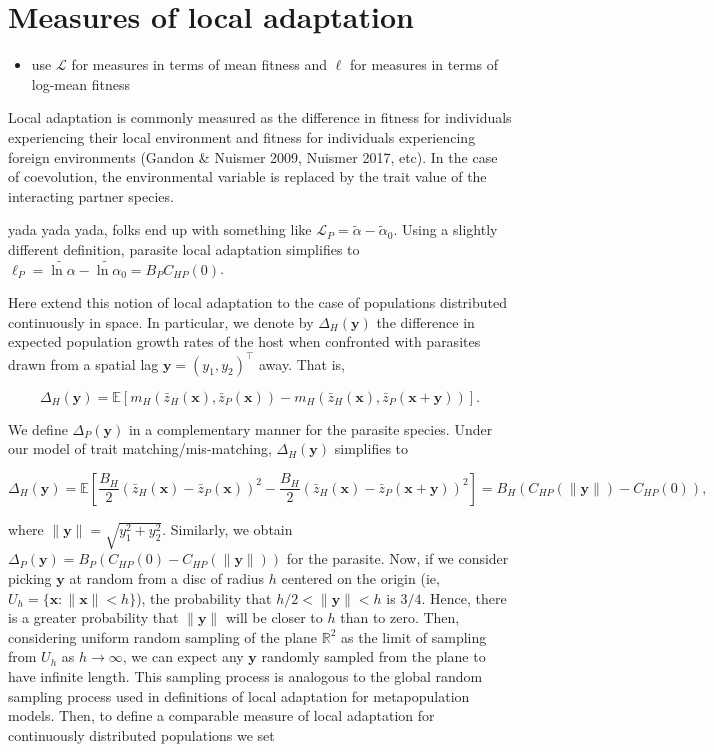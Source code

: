 \documentclass{article}
\begin{document}
\hypertarget{measures-of-local-adaptation}{%
\section{\texorpdfstring{Measures of local adaptation
\label{la-app}}{Measures of local adaptation }}\label{measures-of-local-adaptation}}

\begin{itemize}
\tightlist
\item
  use \(\mathcal L\) for measures in terms of mean fitness and \(\ell\)
  for measures in terms of log-mean fitness
\end{itemize}

Local adaptation is commonly measured as the difference in fitness for
individuals experiencing their local environment and fitness for
individuals experiencing foreign environments (Gandon \& Nuismer 2009,
Nuismer 2017, etc). In the case of coevolution, the environmental
variable is replaced by the trait value of the interacting partner
species.

yada yada yada, folks end up with something like
\(\mathcal L_P=\tilde\alpha-\tilde\alpha_0\). Using a slightly different
definition, parasite local adaptation simplifies to
\(\ell_P=\widetilde{\ln\alpha}-\widetilde{\ln\alpha}_0=B_PC_{HP}(0)\).

Here extend this notion of local adaptation to the case of populations
distributed continuously in space. In particular, we denote by
\(\Delta_H(\pmb y)\) the difference in expected population growth rates
of the host when confronted with parasites drawn from a spatial lag
\(\pmb y=(y_1,y_2)^\top\) away. That is,

\[\Delta_H(\pmb y)=\mathbb E[m_H(\bar z_H(\pmb x),\bar z_P(\pmb x))-m_H(\bar z_H(\pmb x),\bar z_P(\pmb x+\pmb y))].\]

We define \(\Delta_P(\pmb y)\) in a complementary manner for the
parasite species. Under our model of trait matching/mis-matching,
\(\Delta_H(\pmb y)\) simplifies to

\[\Delta_H(\pmb y)=\mathbb E\left[\frac{B_H}{2}\left(\bar z_H(\pmb x)-\bar z_P(\pmb x)\right)^2-\frac{B_H}{2}\left(\bar z_H(\pmb x)-\bar z_P(\pmb x+\pmb y)\right)^2\right]=B_H\left(C_{HP}(\|\pmb y\|)-C_{HP}(0)\right),\]

where \(\|\pmb y\|=\sqrt{y_1^2+y_2^2}\). Similarly, we obtain
\(\Delta_P(\pmb y)=B_P(C_{HP}(0)-C_{HP}(\|\pmb y\|))\) for the parasite.
Now, if we consider picking \(\pmb y\) at random from a disc of radius
\(h\) centered on the origin (ie, \(U_h=\{\pmb x:\|\pmb x\|<h\}\)), the
probability that \(h/2<\|\pmb y\|<h\) is \(3/4\). Hence, there is a
greater probability that \(\|\pmb y\|\) will be closer to \(h\) than to
zero. Then, considering uniform random sampling of the plane
\(\mathbb R^2\) as the limit of sampling from \(U_h\) as \(h\to\infty\),
we can expect any \(\pmb y\) randomly sampled from the plane to have
infinite length. This sampling process is analogous to the global random
sampling process used in definitions of local adaptation for
metapopulation models. Then, to define a comparable measure of local
adaptation for continuously distributed populations we set
\end{document}
